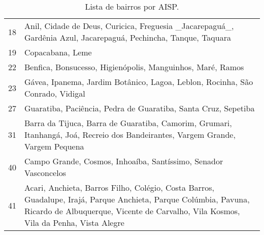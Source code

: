 \begin{table}
\begin{tabular}{cp{12cm}}
 18 &  Anil, Cidade de Deus, Curicica, Freguesia \_Jacarepaguá\_, Gardênia Azul, Jacarepaguá, Pechincha, Tanque, Taquara \\
 19 &  Copacabana, Leme \\
 22 &  Benfica, Bonsucesso, Higienópolis, Manguinhos, Maré, Ramos \\
 23 &  Gávea, Ipanema, Jardim Botânico, Lagoa, Leblon, Rocinha, São Conrado, Vidigal \\
 27 &  Guaratiba, Paciência, Pedra de Guaratiba, Santa Cruz, Sepetiba \\
 31 &  Barra da Tijuca, Barra de Guaratiba, Camorim, Grumari, Itanhangá, Joá, Recreio dos Bandeirantes, Vargem Grande, Vargem Pequena \\
 40 &  Campo Grande, Cosmos, Inhoaíba, Santíssimo, Senador Vasconcelos \\
 41 &  Acari, Anchieta, Barros Filho, Colégio, Costa Barros, Guadalupe, Irajá, Parque Anchieta, Parque Colúmbia, Pavuna, Ricardo de Albuquerque, Vicente de Carvalho, Vila Kosmos, Vila da Penha, Vista Alegre \\
\bottomrule
\end{tabular}
\caption{Lista de bairros por AISP.}
\label{tbl:bairros_aisp}
\end{table}